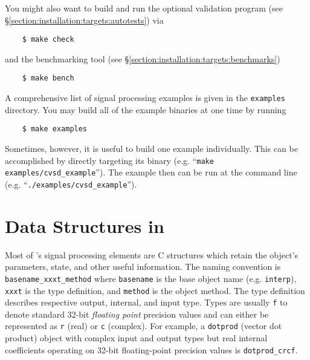 %
You might also want to build and run the optional validation program
(see \S\ref{section:installation:targets:autotests}) via
\begin{verbatim}
    $ make check
\end{verbatim}
and the benchmarking tool
(see \S\ref{section:installation:targets:benchmarks})
\begin{verbatim}
    $ make bench
\end{verbatim}
%
A comprehensive list of signal processing examples is given in the
{\tt examples} directory.
You may build all of the example binaries at one time by running
\begin{verbatim}
    $ make examples
\end{verbatim}
%
Sometimes, however, it is useful to build one example individually.
This can be accomplished by directly targeting its binary
(e.g. ``{\tt make examples/cvsd\_example}'').
The example then can be run at the command line
(e.g. ``{\tt ./examples/cvsd\_example}'').

%
%
\section{Data Structures in \liquid}
\label{section:data_structures}
Most of \liquid's signal processing elements are C structures which
retain the object's parameters, state, and other useful information.
The naming convention is
{\tt basename\_xxxt\_method} where
{\tt basename} is the base object name (e.g. {\tt interp}),
{\tt xxxt} is the type definition, and
{\tt method} is the object method.
The type definition describes respective output, internal, and input type.
Types are usually {\tt f} to denote standard 32-bit {\it floating point}
precision values and can either be represented as {\tt r} (real) or {\tt c}
(complex).
For example, a {\tt dotprod} (vector dot product) object with complex input
and output types but real internal coefficients operating on 32-bit
floating-point precision values is {\tt dotprod\_crcf}.

